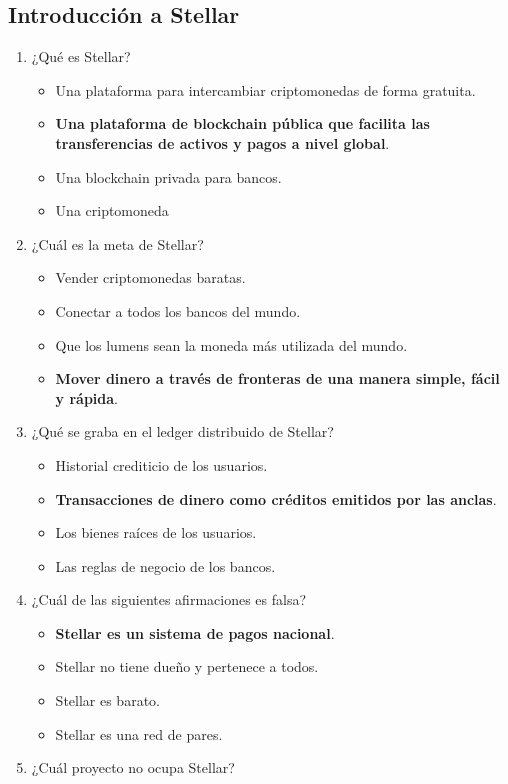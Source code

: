 \documentclass[a4paper,12pt]{/home/armando/Documentos/Cursos/LaTeX/Plantillas/lib/pub}
\begin{document}
\subsection{Introducción a Stellar}
\begin{enumerate}
	\item ¿Qué es Stellar?
	\begin{itemize}
		\item Una plataforma para intercambiar criptomonedas de forma gratuita.
		\item \textbf{Una plataforma de blockchain pública que facilita las transferencias de activos y pagos a nivel global}.
		\item Una blockchain privada para bancos.
		\item Una criptomoneda
	\end{itemize}
	\item ¿Cuál es la meta de Stellar?
	\begin{itemize}
		\item Vender criptomonedas baratas.
		\item Conectar a todos los bancos del mundo.
		\item Que los lumens sean la moneda más utilizada del mundo.
		\item \textbf{Mover dinero a través de fronteras de una manera simple, fácil y rápida}.
	\end{itemize}
	\item ¿Qué se graba en el ledger distribuido de Stellar?
	\begin{itemize}
		\item Historial crediticio de los usuarios.
		\item \textbf{Transacciones de dinero como créditos emitidos por las anclas}.
		\item Los bienes raíces de los usuarios.
		\item Las reglas de negocio de los bancos.
	\end{itemize}
	\item ¿Cuál de las siguientes afirmaciones es falsa?
	\begin{itemize}
		\item \textbf{Stellar es un sistema de pagos nacional}.
		\item Stellar no tiene dueño y pertenece a todos.
		\item Stellar es barato.
		\item Stellar es una red de pares.
	\end{itemize}
	\item ¿Cuál proyecto no ocupa Stellar?

\end{enumerate}
\end{document}
